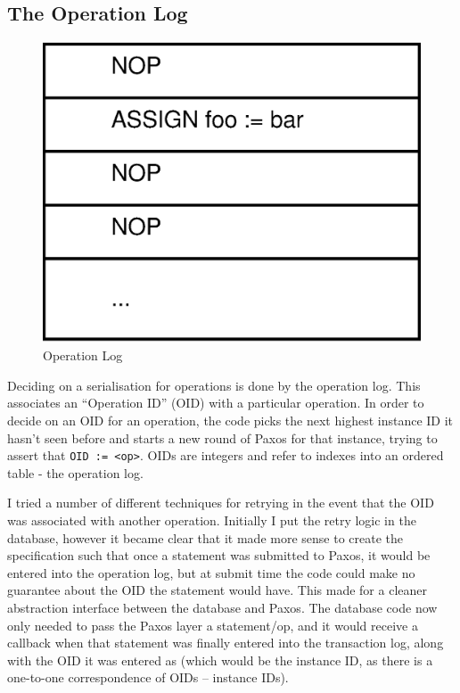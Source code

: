 \documentclass[12pt,twoside,notitlepage]{report}
\begin{document}
\subsection{The Operation Log}

\begin{figure}[htb]
\centering
\includegraphics[scale=0.5]{figs/op-log.eps}
\caption{\label{fig:op-log}Operation Log}
\end{figure}

Deciding on a serialisation for operations is done by the operation log. This associates an
``Operation ID'' (OID) with a particular operation. In order to decide on an OID for an operation,
the code picks the next highest instance ID it hasn't seen before and starts a new round of Paxos
for that instance, trying to assert that \verb$OID := <op>$. OIDs are integers and refer to
indexes into an ordered table - the operation log.

I tried a number of different techniques for retrying in the event that the OID was associated
with another operation. Initially I put the retry logic in the database, however it became clear
that it made more sense to create the specification such that once a statement was submitted to
Paxos, it would be entered into the operation log, but at submit time the code could make no
guarantee about the OID the statement would have. This made for a cleaner abstraction interface
between the database and Paxos. The database code now only needed to pass the Paxos layer a
statement/op, and it would receive a callback when that statement was finally entered into the
transaction log, along with the OID it was entered as (which would be the instance ID, as there is
a one-to-one correspondence of OIDs -- instance IDs).
\end{document}
